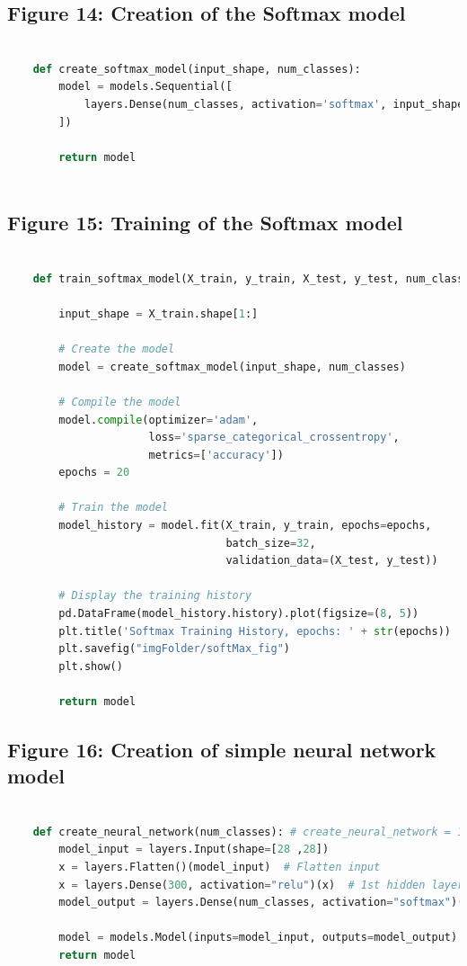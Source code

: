 \documentclass{article}
\begin{document}
\subsection{Figure 14: Creation of the Softmax model}
\begin{lstlisting}[language=Python]

    def create_softmax_model(input_shape, num_classes):    
        model = models.Sequential([
            layers.Dense(num_classes, activation='softmax', input_shape=input_shape)
        ])
    
        return model
        
    \end{lstlisting}
\subsection{Figure 15: Training of the Softmax model}
\begin{lstlisting}[language=Python]

    def train_softmax_model(X_train, y_train, X_test, y_test, num_classes):
    
        input_shape = X_train.shape[1:]
    
        # Create the model
        model = create_softmax_model(input_shape, num_classes)
    
        # Compile the model
        model.compile(optimizer='adam',
                      loss='sparse_categorical_crossentropy',
                      metrics=['accuracy'])
        epochs = 20
    
        # Train the model
        model_history = model.fit(X_train, y_train, epochs=epochs,
                                  batch_size=32,
                                  validation_data=(X_test, y_test))
    
        # Display the training history
        pd.DataFrame(model_history.history).plot(figsize=(8, 5))
        plt.title('Softmax Training History, epochs: ' + str(epochs))
        plt.savefig("imgFolder/softMax_fig")
        plt.show()
    
        return model
    \end{lstlisting}

\subsection{Figure 16: Creation of simple neural network model}
\begin{lstlisting}[language=Python]
    
    def create_neural_network(num_classes): # create_neural_network = 10
        model_input = layers.Input(shape=[28 ,28])
        x = layers.Flatten()(model_input)  # Flatten input
        x = layers.Dense(300, activation="relu")(x)  # 1st hidden layer
        model_output = layers.Dense(num_classes, activation="softmax")(x)  # Output layer

        model = models.Model(inputs=model_input, outputs=model_output)
        return model
\end{lstlisting}
\end{document}

